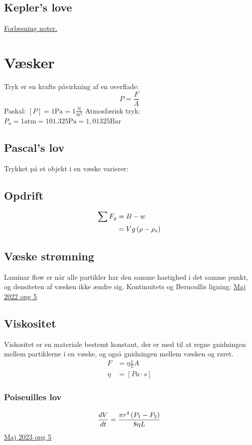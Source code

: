 \documentclass[a4paper,oneside,article]{memoir}
\begin{document}
\subsection{Kepler's love} \label{ssc:keplerslove}
\hyperref[fig:keplerslove]{Forlæsning noter.}

\section{Væsker} \label{sc:væsker}
Tryk er en krafts påvirkning af en overflade: \[P=\frac{F}{A}\]
Paskal: $[P]=1\text{Pa}=1\frac{\text{N}}{\text{m}^2}$
Atmosfærisk tryk: $P_a=1\text{atm} = 101.325\text{Pa}=1,01325\text{Bar}$

\subsection{Pascal's lov} \label{ssc:pascalslov}
Trykket på et objekt i en væske varierer: 

\subsection{Opdrift} \label{ssc:opdrift}
\begin{align*}
    \sum F_y &= B-w \\
    &= Vg\br{\rho-\rho_s}
\end{align*}

\subsection{Væske strømning} \label{ssc:strømning}
Laminar flow er når alle partikler har den samme hastighed i det samme punkt, og densiteten af væsken ikke ændre sig. 
Kontinuitets og Bernoullis ligning:
\hyperref[asc:Maj 2022 opg 5]{Maj 2022 opg 5}

\subsection{Viskositet} \label{ssc:viskositet}
Viskositet er en materiale bestemt konstant, der er med til at regne gnidningen mellem partiklerne i en væske, og også gnidningen mellem væsken og røret. 
\begin{align*}
    F &= \eta \frac{v}{h}A \\
    \eta &= [Pa\cdot s]
\end{align*}
\subsubsection{Poiseuilles lov} \label{sssc:poiseuilleslov}
\begin{align*}
    \frac{dV}{dt} = \frac{\pi r^4 \br{P_1-P_2}}{8\eta L}
\end{align*}
\hyperref[asc:Maj 2023 opg 5]{Maj 2023 opg 5}
\end{document}
